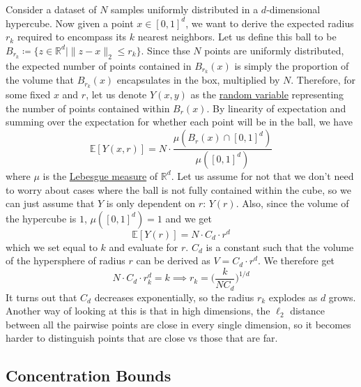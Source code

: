   \begin{example}
    \label{ex:curse-of-dimensionality-in-knn}
    Consider a dataset of $N$ samples uniformly distributed in a $d$-dimensional hypercube. Now given a point $x \in [0, 1]^d$, we want to derive the expected radius $r_k$ required to encompass its $k$ nearest neighbors. Let us define this ball to be $B_{r_k} \coloneqq \{ z \in \mathbb{R}^d \mid \|z - x \|_2 \leq r_k \}$. Since thse $N$ points are uniformly distributed, the expected number of points contained in $B_{r_k} (x)$ is simply the proportion of the volume that $B_{r_k} (x)$ encapsulates in the box, multiplied by $N$. Therefore, for some fixed $x$ and $r$, let us denote $Y(x, y)$ as the \hyperref[prob-def:random-variable]{random variable} representing the number of points contained within $B_r (x)$. By linearity of expectation and summing over the expectation for whether each point will be in the ball, we have 
    \begin{equation}
      \mathbb{E}[Y (x, r)] = N \cdot \frac{\mu(B_r (x) \cap [0, 1]^d) }{\mu([0, 1]^d)}
    \end{equation}
    where $\mu$ is the \hyperref[mt-def:lebesgue-measure]{Lebesgue measure} of $\mathbb{R}^d$. Let us assume for not that we don't need to worry about cases where the ball is not fully contained within the cube, so we can just assume that $Y$ is only dependent on $r$: $Y(r)$. Also, since the volume of the hypercube is $1$,  $\mu([0, 1]^d) = 1$ and we get 
    \begin{equation}
      \mathbb{E}[Y(r)] = N \cdot C_d \cdot r^d
    \end{equation}
    which we set equal to $k$ and evaluate for $r$. $C_d$ is a constant such that the volume of the hypersphere of radius $r$ can be derived as $V = C_d \cdot r^d$. We therefore get 
    \begin{equation}
      N \cdot C_d \cdot r_k^d = k \implies r_k = \bigg( \frac{k}{N C_d} \bigg)^{1/d}
    \end{equation}
    It turns out that $C_d$ decreases exponentially, so the radius $r_k$ explodes as $d$ grows. Another way of looking at this is that in high dimensions, the $\ell_2$ distance between all the pairwise points are close in every single dimension, so it becomes harder to distinguish points that are close vs those that are far.  
  \end{example} 

\subsection{Concentration Bounds} 


